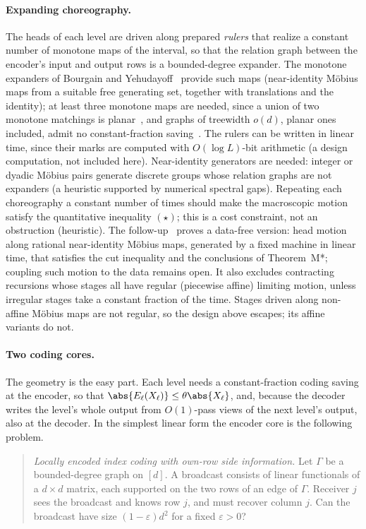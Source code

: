 \paragraph{Expanding choreography.} The heads of each level are driven along prepared \emph{rulers} that realize
a constant number of monotone maps of the interval, so that the relation graph between the encoder's input and
output rows is a bounded-degree expander. The monotone expanders of Bourgain and
Yehudayoff~\cite{BourgainYehudayoff2013} provide such maps (near-identity M\"obius maps from a suitable free
generating set, together with translations and the identity); at least three monotone maps are needed, since a union of two monotone matchings is planar~\cite{DSW2016}, and graphs of treewidth $o(d)$, planar ones included, admit no constant-fraction saving~\cite{BrendeAstra2026}. The rulers can be written in linear time, since their marks are
computed with $O(\log L)$-bit arithmetic (a design computation, not included here). Near-identity generators are needed: integer or dyadic M\"obius pairs generate
discrete groups whose relation graphs are not expanders (a heuristic supported by numerical spectral gaps).
Repeating each choreography a constant number of times should make the macroscopic motion satisfy the quantitative inequality $(\star)$; this is a cost constraint, not an obstruction (heuristic). The follow-up~\cite{BrendeAstra2026} proves a data-free version: head motion along rational near-identity M\"obius maps, generated by a fixed machine in linear time, that satisfies the cut inequality and the conclusions of Theorem~M*; coupling such motion to the data remains open. It also excludes contracting recursions whose stages all have regular (piecewise affine) limiting motion, unless irregular stages take a constant fraction of the time. Stages driven along non-affine M\"obius maps are not regular, so the design above escapes; its affine variants do not.

\paragraph{Two coding cores.} The geometry is the easy part. Each level needs a constant-fraction coding saving at
the encoder, so that $\abs{E_\ell(X_\ell)}\le\theta\abs{X_\ell}$, and, because the decoder writes the level's whole
output from $O(1)$-pass views of the next level's output, also at the decoder. In the simplest linear form the
encoder core is the following problem.

\begin{quote}
\emph{Locally encoded index coding with own-row side information.} Let $\Gamma$ be a bounded-degree graph on
$[d]$. A broadcast consists of linear functionals of a $d\times d$ matrix, each supported on the two rows of an
edge of $\Gamma$. Receiver $j$ sees the broadcast and knows row $j$, and must recover column $j$. Can the broadcast
have size $(1-\varepsilon)d^2$ for a fixed $\varepsilon>0$?
\end{quote}

